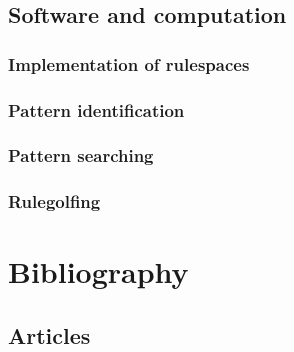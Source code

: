 \documentclass[
	11pt, %
	fleqn, %
	a4paper, %
]{LegrandOrangeBook}
\begin{document}
\section{Software and computation}
\subsection{Implementation of rulespaces}
\subsection{Pattern identification}
\subsection{Pattern searching}
\subsection{Rulegolfing}



\stopcontents[part] %


\chapterimage{} %
\chapterspaceabove{2.5cm} %
\chapterspacebelow{2cm} %


\chapter*{Bibliography}

\section*{Articles}
\end{document}
